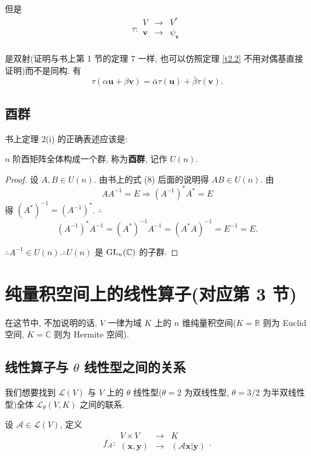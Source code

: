 \documentclass[color=black,device=normal,lang=cn,mode=geye]{elegantnote}
\begin{document}
但是
\[\tau:\begin{array}{rcl}
    V & \to & V^* \\
    \boldsymbol{v} & \to & \psi_{\boldsymbol{v}} \\
\end{array}\]

是双射(证明与书上第 1 节的定理 7 一样, 也可以仿照定理 \ref{t2.2} 不用对偶基直接证明)而不是同构. 有
\[\tau(\alpha\boldsymbol{u}+\beta\boldsymbol{v})=\bar{\alpha}\tau(\boldsymbol{u})+\bar{\beta}\tau(\boldsymbol{v}).\]
\subsection{酉群}
书上定理 2(i) 的正确表述应该是:
\begin{theorem}
    $n$ 阶酉矩阵全体构成一个群, 称为\textbf{酉群}, 记作 $U(n)$.
\end{theorem}
\begin{proof}
    设 $A,B\in U(n)$. 由书上的式 (8) 后面的说明得 $AB\in U(n)$. 由
    \[AA^{-1}=E\Rightarrow(A^{-1})^*A^*=E\]
    得 $(A^*)^{-1}=(A^{-1})^*$. $\therefore$
    \[(A^{-1})^*A^{-1}=(A^*)^{-1}A^{-1}=(A^*A)^{-1}=E^{-1}=E.\]

    $\therefore A^{-1}\in U(n).\therefore U(n)$ 是 $\operatorname{GL} _n(\mathbb{C})$ 的子群.
\end{proof}
\section{纯量积空间上的线性算子(对应第 3 节)}
在这节中, 不加说明的话, $V$ 一律为域 $K$ 上的 $n$ 维纯量积空间($K=\mathbb{R}$ 则为 Euclid 空间, $K=\mathbb{C}$ 则为 Hermite 空间).
\subsection{线性算子与 $\theta$ 线性型之间的关系}
我们想要找到 $\mathcal{L}(V)$ 与 $V$ 上的 $\theta$ 线性型($\theta=2$ 为双线性型, $\theta=3/2$ 为半双线性型)全体 $\mathcal{L}_\theta(V,K)$ 之间的联系.

设 $\mathcal{A}\in\mathcal{L}(V)$, 定义
\[f_{\mathcal{A}}:\begin{array}{rcl}
    V\times V & \to & K \\
    (\boldsymbol{x},\boldsymbol{y}) & \to & (\mathcal{A}\boldsymbol{x}|\boldsymbol{y}) \\
\end{array}.\]
\end{document}
